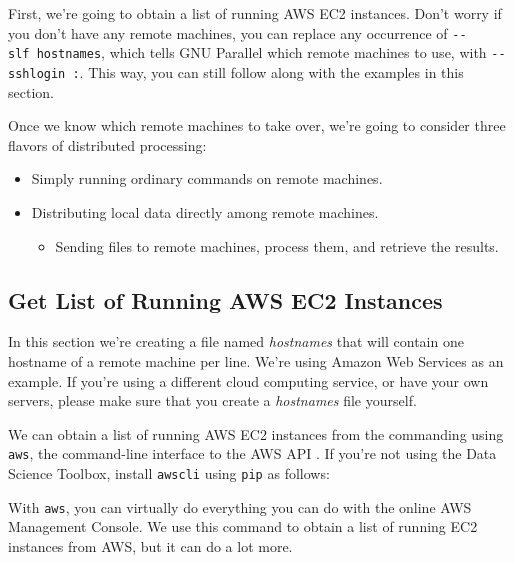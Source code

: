 \documentclass[
]{book}
\newenvironment{Shaded}{\begin{snugshade}}{\end{snugshade}}
\newcommand{\ExtensionTok}[1]{#1}
\newcommand{\NormalTok}[1]{#1}
\providecommand{\tightlist}{%
  \setlength{\itemsep}{0pt}\setlength{\parskip}{0pt}}
\theoremstyle{definition}
\theoremstyle{definition}
\theoremstyle{definition}
\theoremstyle{remark}
\begin{document}
First, we're going to obtain a list of running AWS EC2 instances. Don't worry if you don't have any remote machines, you can replace any occurrence of \texttt{-\/-slf\ hostnames}, which tells GNU Parallel which remote machines to use, with \texttt{-\/-sshlogin\ :}. This way, you can still follow along with the examples in this section.

Once we know which remote machines to take over, we're going to consider three flavors of distributed processing:

\begin{itemize}
\item
  Simply running ordinary commands on remote machines.
\item
  Distributing local data directly among remote machines.

  \begin{itemize}
  \tightlist
  \item
    Sending files to remote machines, process them, and retrieve the results.
  \end{itemize}
\end{itemize}

\hypertarget{get-list-of-running-aws-ec2-instances}{%
\subsection{Get List of Running AWS EC2 Instances}\label{get-list-of-running-aws-ec2-instances}}

In this section we're creating a file named \emph{hostnames} that will contain one hostname of a remote machine per line. We're using Amazon Web Services as an example. If you're using a different cloud computing service, or have your own servers, please make sure that you create a \emph{hostnames} file yourself.

We can obtain a list of running AWS EC2 instances from the commanding using \texttt{aws}, the command-line interface to the AWS API \citep{aws}. If you're not using the Data Science Toolbox, install \texttt{awscli} using \texttt{pip} \citep{pip} as follows:

\begin{Shaded}
\end{Shaded}

With \texttt{aws}, you can virtually do everything you can do with the online AWS Management Console. We use this command to obtain a list of running EC2 instances from AWS, but it can do a lot more.
\end{document}
